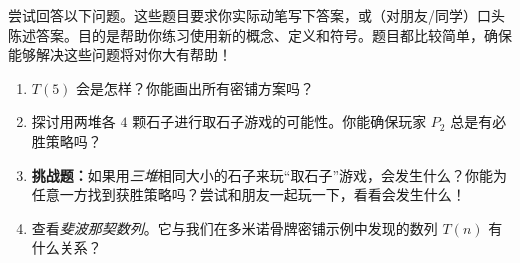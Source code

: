 尝试回答以下问题。这些题目要求你实际动笔写下答案，或（对朋友/同学）口头陈述答案。目的是帮助你练习使用新的概念、定义和符号。题目都比较简单，确保能够解决这些问题将对你大有帮助！

\begin{enumerate}[label=(\arabic*)]
    \item $T(5)$ 会是怎样？你能画出所有密铺方案吗？
    \item 探讨用两堆各 $4$ 颗石子进行取石子游戏的可能性。你能确保玩家 $P_2$ 总是有必胜策略吗？
    \item \textbf{挑战题：}如果用\emph{三堆}相同大小的石子来玩``取石子''游戏，会发生什么？你能为任意一方找到获胜策略吗？尝试和朋友一起玩一下，看看会发生什么！
    \item 查看\emph{斐波那契数列}。它与我们在多米诺骨牌密铺示例中发现的数列 $T(n)$ 有什么关系？
\end{enumerate}